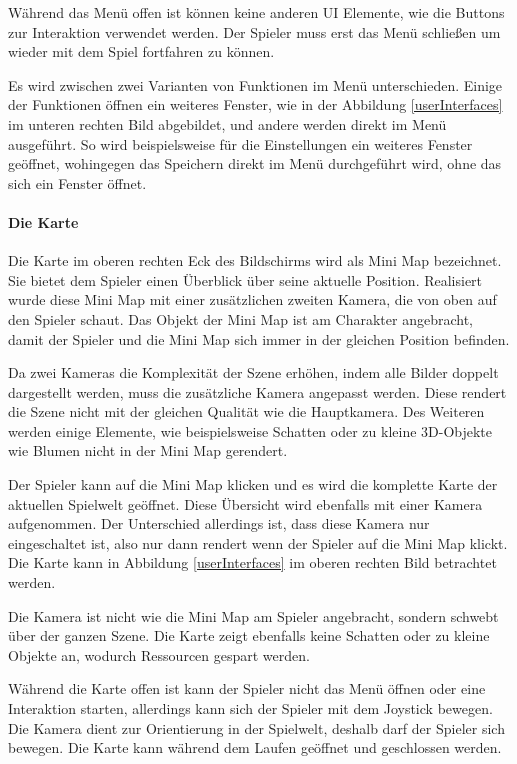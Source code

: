 				Während das Menü offen ist können keine anderen UI Elemente, wie die Buttons zur Interaktion verwendet werden. Der Spieler muss erst das Menü schließen um wieder mit dem Spiel fortfahren zu können. 
				
				Es wird zwischen zwei Varianten von Funktionen im Menü unterschieden. Einige der Funktionen öffnen ein weiteres Fenster, wie in der Abbildung \ref{userInterfaces} im unteren rechten Bild abgebildet, und andere werden direkt im Menü ausgeführt. So wird beispielsweise für die Einstellungen ein weiteres Fenster geöffnet, wohingegen das Speichern direkt im Menü durchgeführt wird, ohne das sich ein Fenster öffnet.
			
			\paragraph{Die Karte}
				Die Karte im oberen rechten Eck des Bildschirms wird als Mini Map bezeichnet. Sie bietet dem Spieler einen Überblick über seine aktuelle Position. Realisiert wurde diese Mini Map mit einer zusätzlichen zweiten Kamera, die von oben auf den Spieler schaut. Das Objekt der Mini Map ist am Charakter angebracht, damit der Spieler und die Mini Map sich immer in der gleichen Position befinden.
								
				Da zwei Kameras die Komplexität der Szene erhöhen, indem alle Bilder doppelt dargestellt werden, muss die zusätzliche Kamera angepasst werden. Diese rendert die Szene nicht mit der gleichen Qualität wie die Hauptkamera. Des Weiteren werden einige Elemente, wie beispielsweise Schatten oder zu kleine 3D-Objekte wie Blumen nicht in der Mini Map gerendert. 
				
				Der Spieler kann auf die Mini Map klicken und es wird die komplette Karte der aktuellen Spielwelt geöffnet. Diese Übersicht wird ebenfalls mit einer Kamera aufgenommen. Der Unterschied allerdings ist, dass diese Kamera nur eingeschaltet ist, also nur dann rendert wenn der Spieler auf die Mini Map klickt. Die Karte kann in Abbildung \ref{userInterfaces} im oberen rechten Bild betrachtet werden.
				
				Die Kamera ist nicht wie die Mini Map am Spieler angebracht, sondern schwebt über der ganzen Szene. Die Karte zeigt ebenfalls keine Schatten oder zu kleine Objekte an, wodurch Ressourcen gespart werden.
				
				Während die Karte offen ist kann der Spieler nicht das Menü öffnen oder eine Interaktion starten, allerdings kann sich der Spieler mit dem Joystick bewegen. Die Kamera dient zur Orientierung in der Spielwelt, deshalb darf der Spieler sich bewegen. Die Karte kann während dem Laufen geöffnet und geschlossen werden.
			
